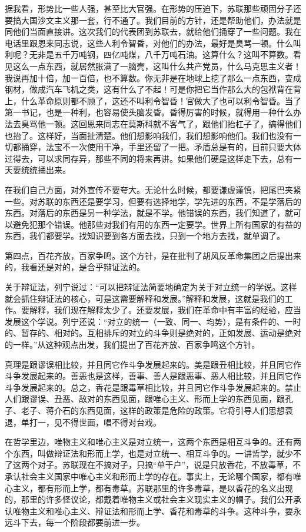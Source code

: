 据我看，形势比一些人强，甚至比大官强。在形势的压迫下，苏联那些顽固分子还要搞大国沙文主义那一套，行不通了。我们目前的方针，还是帮助他们，办法就是同他们当面直接讲。这次我们的代表团到苏联去，就给他们捅穿了一些问题。我在电话里跟恩来同志说，这些人利令智昏，对他们的办法，最好是臭骂一顿。什么叫利呢？无非是五千万吨钢，四亿吨煤，八千万吨石油。这算什么？这叫不算数。看见这么一点东西，就居然胀满了一脑壳，这叫什么共产党员，什么马克思主义者！我说再加十倍，加一百倍，也不算数。你无非是在地球上挖了那么一点东西，变成钢材，做成汽车飞机之类，这有什么了不起！可是你把它当作那么大的包袱背在背上，什么革命原则都不顾了，这还不叫利令智昏！官做大了也可以利令智昏。当了第一书记，也是一种利，也容易使头脑发昏。昏得厉害的时候，就得用一种什么办法去臭骂他一顿。这回恩来同志在莫斯科就不客气了，跟他们抬杠子了，搞得他们也抬了。这样好，当面扯清楚。他们想影响我们，我们想影响他们。我们也没有一切都捅穿，法宝不一次使用干净，手里还留了一把。矛盾总是有的，目前只要大体过得去，可以求同存异，那些不同的将来再讲。如果他们硬是这样走下去，总有一天要统统捅出来。

在我们自己方面，对外宣传不要夸大。无论什么时候，都要谦虚谨慎，把尾巴夹紧一些。对苏联的东西还是要学习，但要有选择地学，学先进的东西，不是学落后的东西。对落后的东西是另一种学法，就是不学。他错误的东西，我们知道了，就可以避免犯那个错误。他那些对我们有用的东西一定要学。世界上所有国家的有益的东西，我们都要学。找知识要到各方面去找，只到一个地方去找，就单调了。

第四点，百花齐放，百家争鸣。这个方针，是在批判了胡风反革命集团之后提出来的，我看还是对的，是合乎辩证法的。

关于辩证法，列宁说过：“可以把辩证法简要地确定为关于对立统一的学说。这样就会抓住辩证法的核心，可是这需要解释和发展。”解释和发展，这就是我们的工作。要解释，我们现在解释太少了。还要发展，我们在革命中有丰富的经验，应当发展这个学说。列宁还说：“对立的统一（一致、同一、均势），是有条件的、一时的、暂存的、相对的。互相排斥的对立的斗争则是绝对的，正如发展、运动是绝对的一样。”从这种观点出发，我们提出了百花齐放、百家争鸣这个方针。

真理是跟谬误相比较，并且同它作斗争发展起来的。美是跟丑相比较，并且同它作斗争发展起来的。善恶也是这样，善事、善人是跟恶事、恶人相比较，并且同它作斗争发展起来的。总之，香花是跟毒草相比较，并且同它作斗争发展起来的。禁止人们跟谬误、丑恶、敌对的东西见面，跟唯心主义、形而上学的东西见面，跟孔子、老子、蒋介石的东西见面，这样的政策是危险的政策。它将引导人们思想衰退，单打一，见不得世面，唱不得对台戏。

在哲学里边，唯物主义和唯心主义是对立统一，这两个东西是相互斗争的。还有两个东西，叫做辩证法和形而上学，也是对立统一、相互斗争的。一讲哲学，就少不了这两个对子。苏联现在不搞对子，只搞“单干户”，说是只放香花，不放毒草，不承认社会主义国家中唯心主义和形而上学的存在。事实上，无论哪个国家，都有唯心主义，都有形而上学，都有毒草。苏联那里的许多毒草，是以香花的名义出现的，那里的许多怪议论，都戴着唯物主义或社会主义现实主义的帽子。我们公开承认唯物主义和唯心主义、辩证法和形而上学、香花和毒草的斗争。这种斗争，要永远斗下去，每一个阶段都要前进一步。

